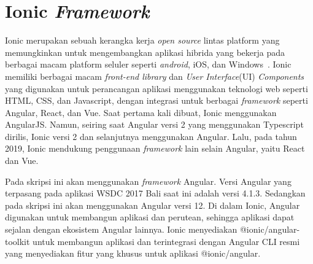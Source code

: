 \section{Ionic {\it Framework}}
\label{sec:ionicframework} 
 
Ionic merupakan sebuah kerangka kerja {\it open source} lintas platform yang memungkinkan untuk mengembangkan aplikasi hibrida yang bekerja pada berbagai macam platform seluler seperti {\it android}, iOS, dan Windows~\cite{waranashiwar:18:ionic}. Ionic memiliki berbagai macam \textit{front-end library} dan \textit{User Interface}(UI) {\it Components} yang digunakan untuk  perancangan aplikasi menggunakan teknologi web seperti HTML, CSS, dan Javascript, dengan integrasi untuk berbagai \textit{framework} seperti Angular, React, dan Vue. Saat pertama kali dibuat, Ionic menggunakan AngularJS. Namun, seiring saat Angular versi 2 yang menggunakan Typescript dirilis, Ionic versi 2 dan selanjutnya menggunakan Angular. Lalu, pada tahun 2019, Ionic mendukung penggunaan \textit{framework} lain selain Angular, yaitu React dan Vue.


Pada skripsi ini akan menggunakan {\it framework} Angular. Versi Angular yang terpasang pada aplikasi WSDC 2017 Bali saat ini adalah versi 4.1.3. Sedangkan pada skripsi ini akan menggunakan Angular versi 12.  Di dalam Ionic, Angular digunakan untuk membangun aplikasi dan perutean, sehingga aplikasi dapat sejalan dengan ekosistem Angular lainnya. Ionic menyediakan @ionic/angular-toolkit untuk membangun aplikasi dan terintegrasi dengan Angular CLI resmi yang menyediakan fitur yang khusus untuk aplikasi @ionic/angular.


